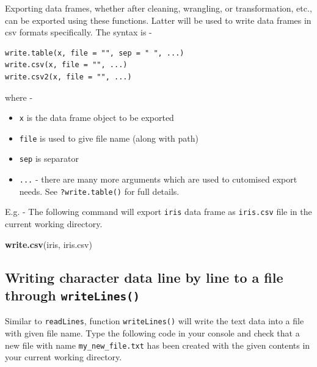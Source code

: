 \documentclass[
]{book}
\newenvironment{Shaded}{\begin{snugshade}}{\end{snugshade}}
\newcommand{\FunctionTok}[1]{\textcolor[rgb]{0.13,0.29,0.53}{\textbf{#1}}}
\newcommand{\NormalTok}[1]{#1}
\newcommand{\StringTok}[1]{\textcolor[rgb]{0.31,0.60,0.02}{#1}}
\providecommand{\tightlist}{%
  \setlength{\itemsep}{0pt}\setlength{\parskip}{0pt}}
\begin{document}
Exporting data frames, whether after cleaning, wrangling, or transformation, etc., can be exported using these functions. Latter will be used to write data frames in csv formats specifically. The syntax is -

\begin{verbatim}
write.table(x, file = "", sep = " ", ...)
write.csv(x, file = "", ...)
write.csv2(x, file = "", ...)
\end{verbatim}

where -

\begin{itemize}
\tightlist
\item
  \texttt{x} is the data frame object to be exported
\item
  \texttt{file} is used to give file name (along with path)
\item
  \texttt{sep} is separator
\item
  \texttt{...} - there are many more arguments which are used to cutomised export needs. See \texttt{?write.table()} for full details.
\end{itemize}

E.g. - The following command will export \texttt{iris} data frame as \texttt{iris.csv} file in the current working directory.

\begin{Shaded}
\begin{Highlighting}[]
\FunctionTok{write.csv}\NormalTok{(iris, }\StringTok{\textquotesingle{}iris.csv\textquotesingle{}}\NormalTok{)}
\end{Highlighting}
\end{Shaded}

\hypertarget{writing-character-data-line-by-line-to-a-file-through-writelines}{%
\subsection*{\texorpdfstring{Writing character data line by line to a file through \texttt{writeLines()}}{Writing character data line by line to a file through writeLines()}}\label{writing-character-data-line-by-line-to-a-file-through-writelines}}

Similar to \texttt{readLines}, function \texttt{writeLines()} will write the text data into a file with given file name. Type the following code in your console and check that a new file with name \texttt{my\_new\_file.txt} has been created with the given contents in your current working directory.
\end{document}
